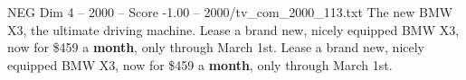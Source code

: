 \begin{textsample}{NEG Dim 4 – 2000 – Score -1.00 – 2000/tv\_com\_2000\_113.txt}  \label{ex:f4_neg_029}
The new BMW X3, the ultimate driving machine.
Lease a brand new, nicely equipped BMW X3, now for \$459 a \textbf{month}, only through March 1st.
Lease a brand new, nicely equipped BMW X3, now for \$459 a \textbf{month}, only through March 1st.

\end{textsample}
